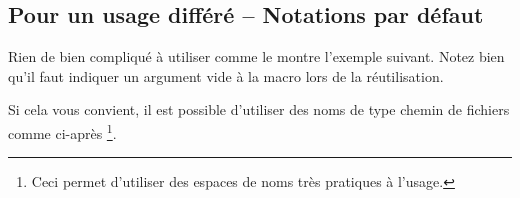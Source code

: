 \documentclass[12pt,a4paper]{article}
\begin{document}

\subsection{Pour un usage différé -- Notations par défaut} \label{tnsproba-calclexpval-name-n-reuse}

Rien de bien compliqué à utiliser comme le montre l'exemple suivant. Notez bien qu'il faut indiquer un argument vide à la macro  lors de la réutilisation.



\begin{remark}
	Si cela vous convient, il est possible d'utiliser des noms de type \og chemin de fichiers \fg{} comme ci-après
	\footnote{
		Ceci permet d'utiliser des espaces de noms très pratiques à l'usage.
	}.
	
\end{remark}
\end{document}
